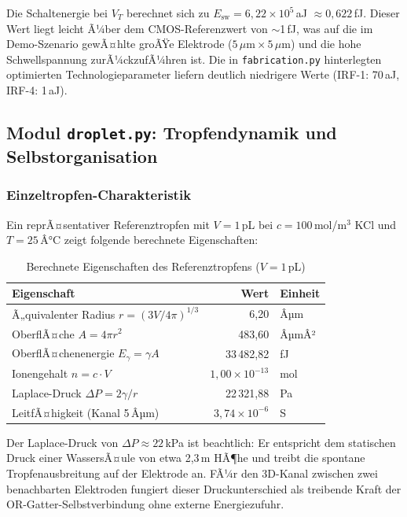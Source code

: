 ﻿\documentclass[a4paper,12pt]{scrreprt}
\theoremstyle{definition}
\begin{document}
Die Schaltenergie bei $V_T$ berechnet sich zu $E_\text{sw} = 6{,}22 \times 10^5$\,aJ $\approx 0{,}622$\,fJ.
Dieser Wert liegt leicht Ã¼ber dem CMOS-Referenzwert von $\sim$1\,fJ, was auf die
im Demo-Szenario gewÃ¤hlte groÃŸe Elektrode ($5\,\mu\text{m} \times 5\,\mu\text{m}$)
und die hohe Schwellspannung zurÃ¼ckzufÃ¼hren ist. Die in \texttt{fabrication.py}
hinterlegten optimierten Technologieparameter liefern deutlich niedrigere Werte
(IRF-1: 70\,aJ, IRF-4: 1\,aJ).

\subsection{Modul \texttt{droplet.py}: Tropfendynamik und Selbstorganisation}
\label{subsec:demo_droplet}

\subsubsection{Einzeltropfen-Charakteristik}

Ein reprÃ¤sentativer Referenztropfen mit $V = 1$\,pL bei $c = 100$\,mol/m$^3$
KCl und $T = 25$\,Â°C zeigt folgende berechnete Eigenschaften:

\begin{table}[H]
	\centering
	\caption{Berechnete Eigenschaften des Referenztropfens ($V = 1$\,pL)}
	\label{tab:tropfen}
	\begin{tabular}{lrl}
		\toprule
		\textbf{Eigenschaft} & \textbf{Wert} & \textbf{Einheit} \\
		\midrule
		Ã„quivalenter Radius $r = (3V/4\pi)^{1/3}$ & 6,20 & Âµm \\
		OberflÃ¤che $A = 4\pi r^2$                 & 483,60 & ÂµmÂ² \\
		OberflÃ¤chenenergie $E_\gamma = \gamma A$  & 33\,482,82 & fJ \\
		Ionengehalt $n = c \cdot V$               & $1{,}00 \times 10^{-13}$ & mol \\
		Laplace-Druck $\Delta P = 2\gamma/r$      & 22\,321,88 & Pa \\
		LeitfÃ¤higkeit (Kanal 5\,Âµm)               & $3{,}74 \times 10^{-6}$ & S \\
		\bottomrule
	\end{tabular}
\end{table}

Der Laplace-Druck von $\Delta P \approx 22$\,kPa ist beachtlich: Er entspricht
dem statischen Druck einer WassersÃ¤ule von etwa 2,3\,m HÃ¶he und treibt die
spontane Tropfenausbreitung auf der Elektrode an. FÃ¼r den 3D-Kanal zwischen
zwei benachbarten Elektroden fungiert dieser Druckunterschied als treibende
Kraft der OR-Gatter-Selbstverbindung ohne externe Energiezufuhr.
\end{document}
